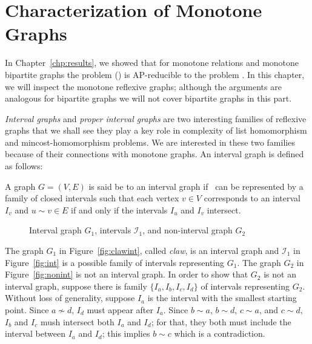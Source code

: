 \chapter{Characterization of Monotone Graphs}
In Chapter~\ref{chp:results}, we showed that for monotone relations and monotone
bipartite graphs the problem \ccsp(\mH) is AP-reducible to the problem \cbis\@. In this chapter,
we will inspect the monotone reflexive graphs; although the arguments are
analogous for bipartite graphs we will not cover bipartite graphs in this part.

\emph{Interval graphs} and \emph{proper interval graphs}
are two interesting families of reflexive graphs that we shall see they play a key role in complexity of 
list homomorphism and mincost-homomorphism problems. We are interested in these two families
because of their connections with monotone graphs. An interval graph is defined as follows:

\begin{defi}
A graph \(G=(V,E)\) is said be to an interval graph if \mG\ can
be represented by a family of closed intervals such that
each vertex \(v \in V\) corresponds to an interval \(I_v\) and \(u \sim v \in E\)
if and only if the intervals \(I_u\) and \(I_v\) intersect.
\end{defi}

\begin{figure} [h]
\hspace{1cm}
\subfigure[\ensuremath{G_1}]{\label{fig:clawint}} \hspace{2cm}
\subfigure[\ensuremath{I_1}]{\label{fig:int}}\hspace{2cm}
\subfigure[\ensuremath{G_2}]{\label{fig:nonint}}
\caption{Interval graph \ensuremath{G_1}, intervals \ensuremath{\mathcal{I}_1}, and non-interval graph \ensuremath{G_2}}
\end{figure}

The graph \(G_1\) in Figure~\ref{fig:clawint}, called \emph{claw}, is an interval graph
and \(\mathcal{I}_1\) in Figure~\ref{fig:int} is a possible family of intervals representing \(G_1\)\@.
The graph \(G_2\) in Figure~\ref{fig:nonint} is not an interval graph. In order to show that \(G_2\) is not
an interval graph, suppose there is family \(\{I_a, I_b, I_c, I_d\}\) of intervals representing \(G_2\)\@.
Without loss of generality, suppose \(I_a\) is the interval with the smallest starting point.
Since \(a\not \sim d\), \(I_d\) must appear after \(I_a\)\@. Since \(b\sim a\), \(b\sim d\), \(c\sim a\), and \(c\sim d\),
\(I_b\) and \(I_c\) mush intersect both \(I_a\) and \(I_d\); for that, they both must include the interval between
\(I_a\) and \(I_d\); this implies \(b\sim c\) which is a contradiction.


